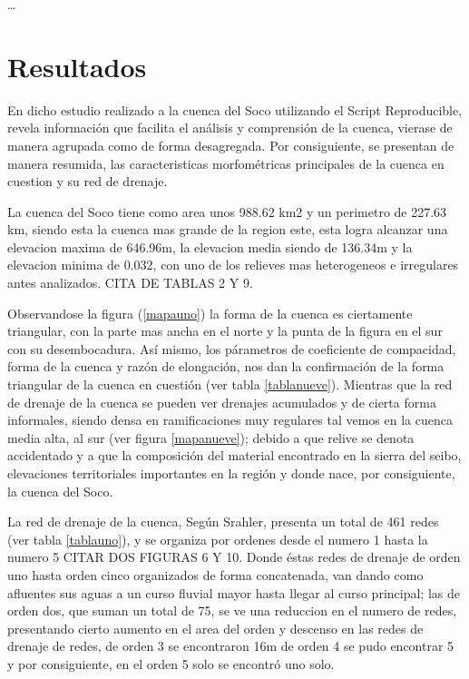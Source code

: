 \documentclass[11pt,]{article}
\begin{document}
\ldots

\section{Resultados}\label{resultados}

En dicho estudio realizado a la cuenca del Soco utilizando el Script
Reproducible, revela información que facilita el análisis y comprensión
de la cuenca, vierase de manera agrupada como de forma desagregada. Por
consiguiente, se presentan de manera resumida, las caracteristicas
morfométricas principales de la cuenca en cuestion y su red de drenaje.

La cuenca del Soco tiene como area unos 988.62 km2 y un perimetro de
227.63 km, siendo esta la cuenca mas grande de la region este, esta
logra alcanzar una elevacion maxima de 646.96m, la elevacion media
siendo de 136.34m y la elevacion minima de 0.032, con uno de los
relieves mas heterogeneos e irregulares antes analizados. CITA DE TABLAS
2 Y 9.

Observandose la figura (\ref{mapauno}) la forma de la cuenca es
ciertamente triangular, con la parte mas ancha en el norte y la punta de
la figura en el sur con su desembocadura. Así mismo, los párametros de
coeficiente de compacidad, forma de la cuenca y razón de elongación, nos
dan la confirmación de la forma triangular de la cuenca en cuestión (ver
tabla \ref{tablanueve}). Mientras que la red de drenaje de la cuenca se
pueden ver drenajes acumulados y de cierta forma informales, siendo
densa en ramificaciones muy regulares tal vemos en la cuenca media alta,
al sur (ver figura \ref{mapanueve}); debido a que relive se denota
accidentado y a que la composición del material encontrado en la sierra
del seibo, elevaciones territoriales importantes en la región y donde
nace, por consiguiente, la cuenca del Soco.

La red de drenaje de la cuenca, Según Srahler, presenta un total de 461
redes (ver tabla \ref{tablauno}), y se organiza por ordenes desde el
numero 1 hasta la numero 5 CITAR DOS FIGURAS 6 Y 10. Donde éstas redes
de drenaje de orden uno hasta orden cinco organizados de forma
concatenada, van dando como afluentes sus aguas a un curso fluvial mayor
hasta llegar al curso principal; las de orden dos, que suman un total de
75, se ve una reduccion en el numero de redes, presentando cierto
aumento en el area del orden y descenso en las redes de drenaje de
redes, de orden 3 se encontraron 16m de orden 4 se pudo encontrar 5 y
por consiguiente, en el orden 5 solo se encontró uno solo.
\end{document}
